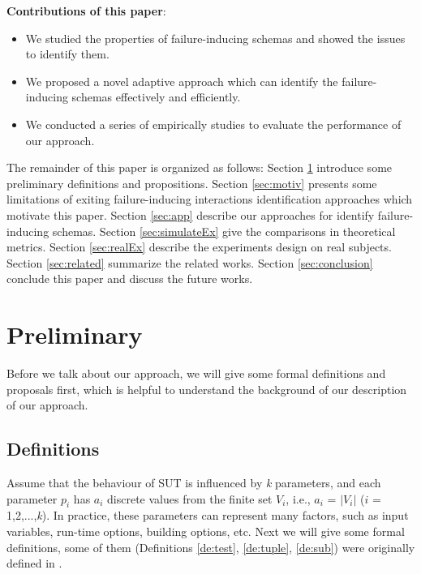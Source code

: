 \documentclass[10pt,journal,cspaper,compsoc]{IEEEtran}
\begin{document}
\textbf{Contributions of this paper}:
\begin{itemize}
  \item We studied the properties of failure-inducing schemas and showed the issues to identify them.
  \item We proposed a novel adaptive approach which can identify the failure-inducing schemas effectively and efficiently.
  \item We conducted a series of empirically studies to evaluate the performance of our approach.
\end{itemize}

The remainder of this paper is organized as follows: Section \ref{sec:back} introduce some preliminary definitions and propositions. Section \ref{sec:motiv} presents some limitations of exiting failure-inducing interactions identification approaches which motivate this paper. Section \ref{sec:app} describe our approaches for identify failure-inducing schemas. Section \ref{sec:simulateEx} give the comparisons in theoretical metrics. Section \ref{sec:realEx} describe the experiments design on real subjects. Section \ref{sec:related} summarize the related works. Section \ref{sec:conclusion} conclude this paper and discuss the future works.

\section{Preliminary} \label{sec:back}
Before we talk about our approach, we will give some formal definitions and proposals first, which is helpful to understand the background of our description of our approach.

\subsection{Definitions}\label{sec:back:define}
Assume that the behaviour of SUT is influenced by \emph{k} parameters, and each parameter $p_{i}$ has $a_{i}$ discrete values from the finite set $V_{i}$, i.e., $a_{i}$ = $|V_{i}|$ ($i$ = 1,2,...,\emph{k}). In practice, these parameters can represent many factors, such as input variables, run-time options, building options, etc. Next we will give some formal definitions, some of them (Definitions \ref{de:test}, \ref{de:tuple}, \ref{de:sub}) were originally defined in \cite{nie2011survey}.
\end{document}
